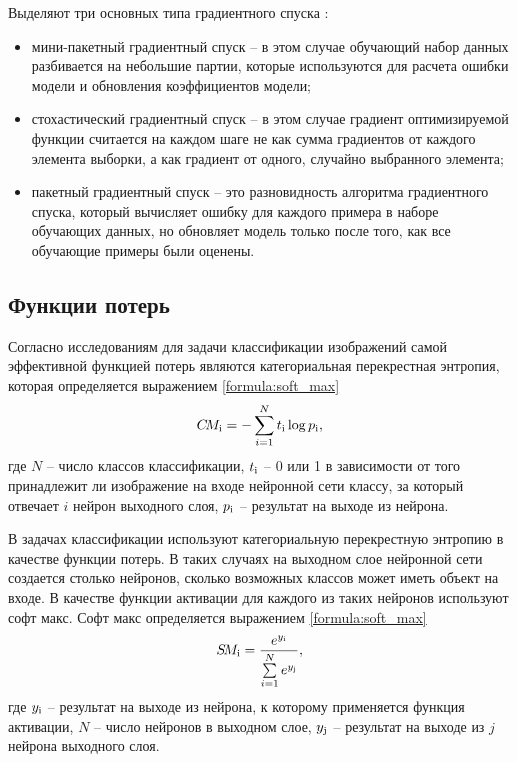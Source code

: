 Выделяют три основных типа градиентного спуска \cite{gradient}:
\begin{itemize}
	\item мини-пакетный градиентный спуск -- в этом случае обучающий набор данных разбивается на небольшие партии, которые используются для расчета ошибки модели и обновления коэффициентов модели;
	\item стохастический градиентный спуск -- в этом случае градиент
	оптимизируемой функции считается на каждом шаге не как сумма
	градиентов от каждого элемента выборки, а как градиент от одного,
	случайно выбранного элемента;
	\item пакетный градиентный спуск -- это разновидность
	алгоритма градиентного спуска, который вычисляет ошибку для
	каждого примера в наборе обучающих данных, но обновляет модель
	только после того, как все обучающие примеры были оценены.
\end{itemize}

\subsection{Функции потерь}
Согласно исследованиям \cite{loss_function} для задачи классификации изображений самой эффективной функцией потерь являются категориальная перекрестная энтропия, которая определяется выражением \ref{formula:soft_max}
\begin{equation}\label{formula:soft_max}
C\!M_{\rm{i}} = - \sum\limits_{i = 1}^{N}t_{\rm{i}}\log{p_{\rm{i}}},
\end{equation}
где $N$ -- число классов классификации, $t_{\rm{i}}$ -- 0 или 1 в зависимости от того принадлежит ли изображение на входе нейронной сети классу, за который отвечает $i$ нейрон выходного слоя, $p_{\rm{i}}$ -- результат на выходе из нейрона.

В задачах классификации используют категориальную перекрестную энтропию в качестве функции потерь. В таких случаях на выходном слое нейронной сети создается столько нейронов, сколько возможных классов может иметь объект на входе. В качестве функции активации для каждого из таких нейронов используют софт макс. Софт макс определяется выражением \ref{formula:soft_max}
\begin{equation}\label{formula:soft_max}
S\!M_{\rm{i}} = \frac{e^{y_{\rm{i}}}}{\sum\limits_{i = 1}^{N}e^{y_{\rm{j}}}},
\end{equation}
где $y_{\rm{i}}$ -- результат на выходе из нейрона, к которому применяется функция активации, $N$ -- число нейронов в выходном слое, $y_{\rm{j}}$ -- результат на выходе из $j$ нейрона выходного слоя.

